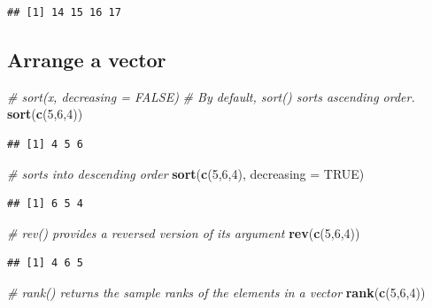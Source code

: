 \documentclass[]{book}
\newenvironment{Shaded}{\begin{snugshade}}{\end{snugshade}}
\newcommand{\CommentTok}[1]{\textcolor[rgb]{0.56,0.35,0.01}{\textit{#1}}}
\newcommand{\DataTypeTok}[1]{\textcolor[rgb]{0.13,0.29,0.53}{#1}}
\newcommand{\DecValTok}[1]{\textcolor[rgb]{0.00,0.00,0.81}{#1}}
\newcommand{\KeywordTok}[1]{\textcolor[rgb]{0.13,0.29,0.53}{\textbf{#1}}}
\newcommand{\NormalTok}[1]{#1}
\newcommand{\OtherTok}[1]{\textcolor[rgb]{0.56,0.35,0.01}{#1}}
\begin{document}
\begin{verbatim}
## [1] 14 15 16 17
\end{verbatim}

\hypertarget{arrange-a-vector}{%
\subsection{Arrange a vector}\label{arrange-a-vector}}

\begin{Shaded}
\begin{Highlighting}[]
\CommentTok{# sort(x, decreasing = FALSE) }
\CommentTok{# By default, sort() sorts ascending order.}
\KeywordTok{sort}\NormalTok{(}\KeywordTok{c}\NormalTok{(}\DecValTok{5}\NormalTok{,}\DecValTok{6}\NormalTok{,}\DecValTok{4}\NormalTok{))}
\end{Highlighting}
\end{Shaded}

\begin{verbatim}
## [1] 4 5 6
\end{verbatim}

\begin{Shaded}
\begin{Highlighting}[]
\CommentTok{# sorts into descending order}
\KeywordTok{sort}\NormalTok{(}\KeywordTok{c}\NormalTok{(}\DecValTok{5}\NormalTok{,}\DecValTok{6}\NormalTok{,}\DecValTok{4}\NormalTok{), }\DataTypeTok{decreasing =} \OtherTok{TRUE}\NormalTok{)}
\end{Highlighting}
\end{Shaded}

\begin{verbatim}
## [1] 6 5 4
\end{verbatim}

\begin{Shaded}
\begin{Highlighting}[]
\CommentTok{# rev() provides a reversed version of its argument}
\KeywordTok{rev}\NormalTok{(}\KeywordTok{c}\NormalTok{(}\DecValTok{5}\NormalTok{,}\DecValTok{6}\NormalTok{,}\DecValTok{4}\NormalTok{))}
\end{Highlighting}
\end{Shaded}

\begin{verbatim}
## [1] 4 6 5
\end{verbatim}

\begin{Shaded}
\begin{Highlighting}[]
\CommentTok{# rank() returns the sample ranks of the elements in a vector}
\KeywordTok{rank}\NormalTok{(}\KeywordTok{c}\NormalTok{(}\DecValTok{5}\NormalTok{,}\DecValTok{6}\NormalTok{,}\DecValTok{4}\NormalTok{))}
\end{Highlighting}
\end{Shaded}
\end{document}
